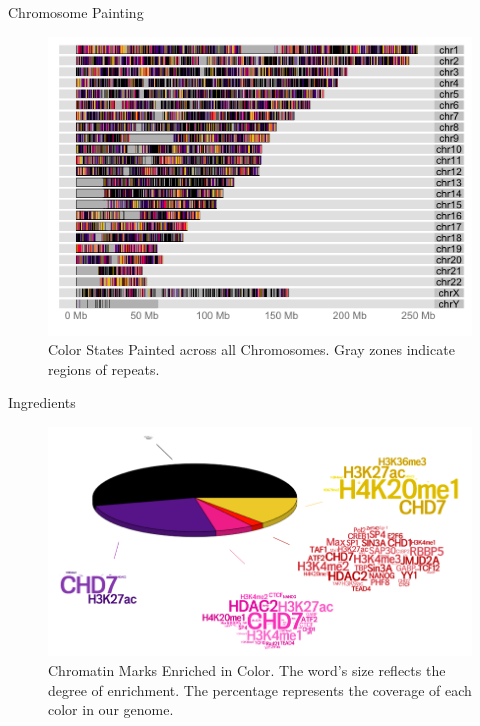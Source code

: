 \documentclass[serif,mathserif,final]{beamer}
\begin{document}
\begin{frame}{}
\begin{columns}[t]
       
    \begin{column}{0.32\linewidth}

      \begin{block}{Chromosome Painting}
        \begin{figure}
   			\includegraphics[width=1\textwidth]{chromatinpainted}
			\caption{Color States Painted across all Chromosomes. Gray zones indicate regions of repeats.}
  		\end{figure}
      
	  \end{block}
      \begin{block}{Ingredients}
      
		\begin{figure}
			\includegraphics[width=1\textwidth]{H1pizza}
			\caption{Chromatin Marks Enriched in Color. The word's size reflects the degree of enrichment. The percentage represents the coverage of each color in our genome.}
		\end{figure}
		

\end{block}
\end{column}
\end{columns}
\end{frame}
\end{document}
